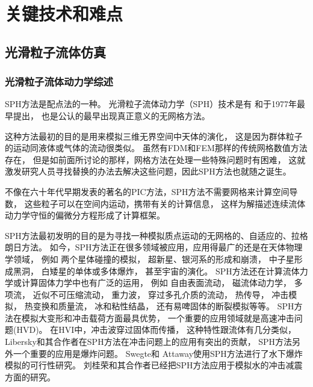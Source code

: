 \chapter{关键技术和难点}

\section{光滑粒子流体仿真}

\subsection {光滑粒子流体动力学综述}
SPH方法是配点法的一种。
光滑粒子流体动力学（SPH）技术是有\citeauthor{Lucy1977A}
和\citeauthor{Gingold1977Smoothed}于1977年最早提出，
也是公认的最早出现真正意义的无网格方法。

这种方法最初的目的是用来模拟三维无界空间中天体的演化，
这是因为群体粒子的运动同液体或气体的流动很类似。
虽然有FDM和FEM那样的传统网格数值方法存在，
但是如前面所讨论的那样，网格方法在处理一些特殊问题时有困难，
这就激发研究人员寻找替换的办法去解决这些问题，因此SPH方法也就随之诞生。

不像在六十年代早期发表的著名的PIC方法，SPH方法不需要网格来计算空间导数，
这些粒子可以在空间内运动，携带有关的计算信息，
这样为解描述连续流体动力学守恒的偏微分方程形成了计算框架。

SPH方法最初发明的目的是为寻找一种模拟质点运动的无网格的、自适应的、拉格朗日方法。
如今，SPH方法正在很多领域被应用，应用得最广的还是在天体物理学领域，
例如
两个星体碰撞的模拟，
超新星、银河系的形成和崩溃，
中子星形成黑洞，
白矮星的单体或多体爆炸，
甚至宇宙的演化。
SPH方法还在计算流体力学或计算固体力学中也有广泛的运用，
例如
自由表面流动，
磁流体动力学，
多项流，
近似不可压缩流动，
重力波，
穿过多孔介质的流动，
热传导，
冲击模拟，
热变换和质量流，
冰和粘性结晶，
还有易啤固体的断裂模拟等等。
SPH方法在模拟大变形和冲击载荷方面最具优势，
一个重要的应用领域就是高速冲击问题(HVD)。
在HVI中，冲击波穿过固体而传播， 这种特性跟流体有几分类似，
Libersky和其合作者在SPH方法在冲击问题上的应用有突出的贡献，
SPH方法另外一个重要的应用是爆炸问题。
Swegte和 Attaway使用SPH方法进行了水下爆炸模拟的可行性研究。
刘桂荣和其合作者已经把SPH方法应用于模拟水的冲击减震方面的研究。

